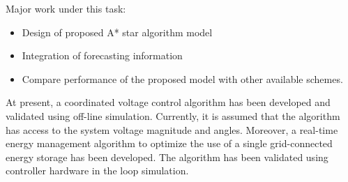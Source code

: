 Major work under this task:
\begin{itemize}
    \item Design of proposed A* star algorithm model 
    \item Integration of forecasting information
    \item Compare performance of the proposed model with other available schemes.
\end{itemize}


At present, a coordinated voltage control algorithm has been developed and validated using off-line simulation. Currently, it is assumed that the algorithm has access to the system voltage magnitude and angles. Moreover, a real-time energy management algorithm to optimize the use of a single grid-connected energy storage has been developed. The algorithm has been validated using controller hardware in the loop simulation.